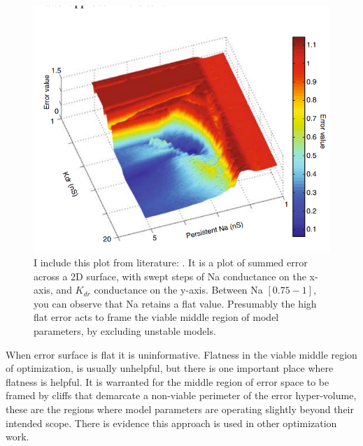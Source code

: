 \begin{figure}
    \centering
    \includegraphics[scale=0.65]{figures/cliff.png}
    \caption[A plot of a cliff ledge framing a 2D error surface]{I include this plot from  literature:
\citep{van2007neurofitter,van2008automated}. It is a plot of summed error across a 2D surface, with swept steps of Na conductance on the x-axis, and $K_{dr}$ conductance on the y-axis. Between Na $[0.75-1]$, you can observe that Na retains a flat value. Presumably the high flat error acts to frame the viable middle region of model parameters, by excluding unstable models.}
    \label{fig:best_at_edge}
\end{figure}
When error surface is flat it is uninformative. Flatness in the viable middle region of optimization, is usually unhelpful, but there is one important place where flatness is helpful. It is warranted for the middle region of error space to be framed by cliffs that demarcate a non-viable perimeter of the error hyper-volume, these are the regions where model parameters are operating slightly beyond their intended scope. There is evidence this approach is used in other optimization work.


